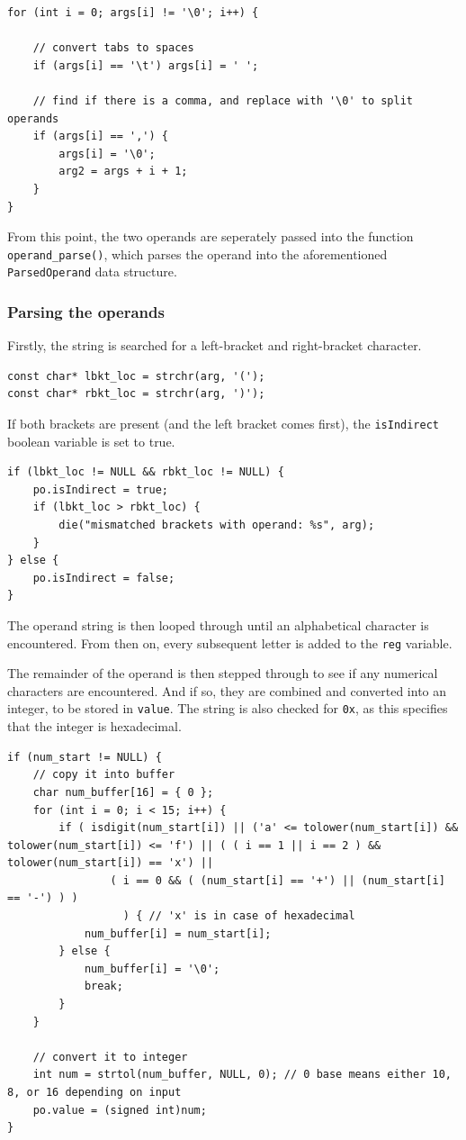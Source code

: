 \documentclass[a4paper]{report}
\begin{document}
\begin{lstlisting}
for (int i = 0; args[i] != '\0'; i++) {

	// convert tabs to spaces
	if (args[i] == '\t') args[i] = ' ';

	// find if there is a comma, and replace with '\0' to split operands
	if (args[i] == ',') {
		args[i] = '\0';
		arg2 = args + i + 1;
	}
}
\end{lstlisting}

From this point, the two operands are seperately passed into the function
\texttt{operand\_parse()}, which parses the operand into the aforementioned
\texttt{ParsedOperand} data structure.

\subsubsection{Parsing the operands}

Firstly, the string is searched for a left-bracket and right-bracket character.

\begin{lstlisting}
const char* lbkt_loc = strchr(arg, '(');
const char* rbkt_loc = strchr(arg, ')');
\end{lstlisting}

If both brackets are present (and the left bracket comes first), the
\texttt{isIndirect} boolean variable is set to true.

\begin{lstlisting}
if (lbkt_loc != NULL && rbkt_loc != NULL) {
	po.isIndirect = true;
	if (lbkt_loc > rbkt_loc) {
		die("mismatched brackets with operand: %s", arg);
	}
} else {
	po.isIndirect = false;
}
\end{lstlisting}

The operand string is then looped through until an alphabetical character is
encountered. From then on, every subsequent letter is added to the \texttt{reg}
variable.

The remainder of the operand is then stepped through to see if any numerical
characters are encountered. And if so, they are combined and converted into an
integer, to be stored in \texttt{value}. The string is also checked for
\texttt{0x}, as this specifies that the integer is hexadecimal.

\begin{lstlisting}
if (num_start != NULL) {
	// copy it into buffer
	char num_buffer[16] = { 0 };
	for (int i = 0; i < 15; i++) {
		if ( isdigit(num_start[i]) || ('a' <= tolower(num_start[i]) && tolower(num_start[i]) <= 'f') || ( ( i == 1 || i == 2 ) && tolower(num_start[i]) == 'x') ||
				( i == 0 && ( (num_start[i] == '+') || (num_start[i] == '-') ) )
				  ) { // 'x' is in case of hexadecimal
			num_buffer[i] = num_start[i];
		} else {
			num_buffer[i] = '\0';
			break;
		}
	}

	// convert it to integer
	int num = strtol(num_buffer, NULL, 0); // 0 base means either 10, 8, or 16 depending on input
	po.value = (signed int)num;
}
\end{lstlisting}
\end{document}
